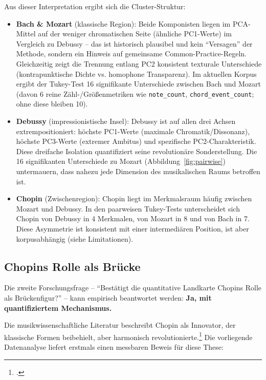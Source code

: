 \documentclass[12pt,a4paper]{article}
\theoremstyle{definition}
\begin{document}
Aus dieser Interpretation ergibt sich die Cluster-Struktur:
\begin{itemize}
    \item \textbf{Bach \& Mozart} (klassische Region): Beide Komponisten liegen im PCA-Mittel auf der weniger chromatischen Seite (ähnliche PC1-Werte) im Vergleich zu Debussy -- das ist historisch plausibel und kein \enquote{Versagen} der Methode, sondern ein Hinweis auf gemeinsame Common-Practice-Regeln. Gleichzeitig zeigt die Trennung entlang PC2 konsistent texturale Unterschiede (kontrapunktische Dichte vs. homophone Transparenz). Im aktuellen Korpus ergibt der Tukey-Test 16 signifikante Unterschiede zwischen Bach und Mozart (davon 6 reine Zähl-/Größenmetriken wie \texttt{note\_count}, \texttt{chord\_event\_count}; ohne diese bleiben 10).
    
    \item \textbf{Debussy} (impressionistische Insel): Debussy ist auf allen drei Achsen extrempositioniert: höchste PC1-Werte (maximale Chromatik/Dissonanz), höchste PC3-Werte (extremer Ambitus) und spezifische PC2-Charakteristik. Diese dreifache Isolation quantifiziert seine revolutionäre Sonderstellung. Die 16 signifikanten Unterschiede zu Mozart (Abbildung~\ref{fig:pairwise}) untermauern, dass nahezu jede Dimension des musikalischen Raums betroffen ist.
    
    \item \textbf{Chopin} (Zwischenregion): Chopin liegt im Merkmalsraum häufig zwischen Mozart und Debussy. In den paarweisen Tukey-Tests unterscheidet sich Chopin von Debussy in 4 Merkmalen, von Mozart in 8 und von Bach in 7. Diese Asymmetrie ist konsistent mit einer intermediären Position, ist aber korpusabhängig (siehe Limitationen).
\end{itemize}

\subsection{Chopins Rolle als Brücke}
Die zweite Forschungsfrage -- \enquote{Bestätigt die quantitative Landkarte Chopins Rolle als Brückenfigur?} -- kann empirisch beantwortet werden: \newline\textbf{Ja, mit quantifiziertem Mechanismus.}

Die musikwissenschaftliche Literatur beschreibt Chopin als Innovator, der klassische Formen beibehielt, aber harmonisch revolutionierte.\footnote{\cite{ChopinTransformations}.} Die vorliegende Datenanalyse liefert erstmals einen messbaren Beweis für diese These:
\end{document}
